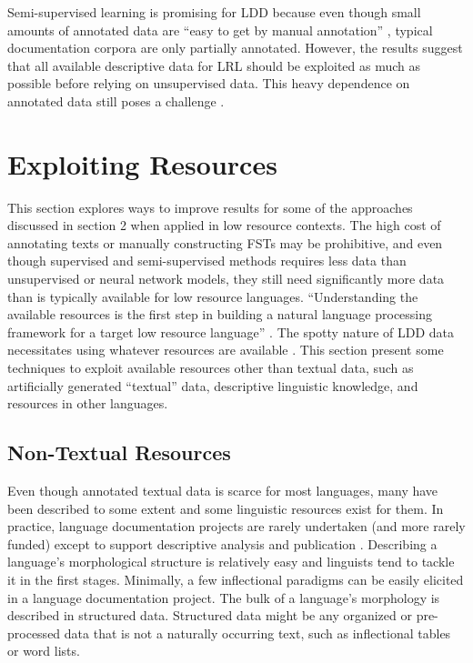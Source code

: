 \documentclass[12pt]{article}
\begin{document}
Semi-supervised learning is promising for LDD because even though small amounts of annotated data are ``easy to get by manual annotation'' \cite[page 49]{virpioja_empirical_2011}, typical documentation corpora are only partially annotated. However, the results suggest that all available descriptive data for LRL should be exploited as much as possible before relying on unsupervised data. This heavy dependence on annotated data still poses a challenge \cite{andrews_bayesian_2017}. 

\section{Exploiting Resources}
\label{resources}

This section explores ways to improve results for some of the approaches discussed in section 2 when applied in low resource  contexts. The high cost of annotating texts or manually constructing FSTs may be prohibitive,  and even though supervised and semi-supervised methods requires less data than unsupervised or neural network models, they still need significantly more data than is typically available for low resource languages. ``Understanding the available resources is the first step in building a natural language processing framework for a target low resource language'' \cite[page 13]{duong_natural_2017}. The spotty nature of LDD data necessitates using whatever resources are available \cite{palmer_semi-automated_2009}. This section present some techniques to exploit available resources other than textual data, such as artificially generated ``textual'' data, descriptive linguistic knowledge, and resources in other languages. 

\subsection{Non-Textual Resources}

Even though annotated textual data is scarce for most languages, many have been described to some extent and some linguistic resources exist for them. In practice, language documentation projects are rarely undertaken (and more rarely funded) except to support descriptive analysis and publication \cite{thieberger_using_2012,austin_language_2014,vallejos_integrating_2014,thieberger_assessing_2016}. Describing a language’s morphological structure is relatively easy \cite{roark_computational_2007} and linguists tend to tackle it in the first stages. Minimally, a few inflectional paradigms can be easily elicited in a language documentation project. The bulk of a language’s morphology is described in structured data. Structured data might be any organized or pre-processed data that is not a naturally occurring text, such as inflectional tables or word lists.
\end{document}
